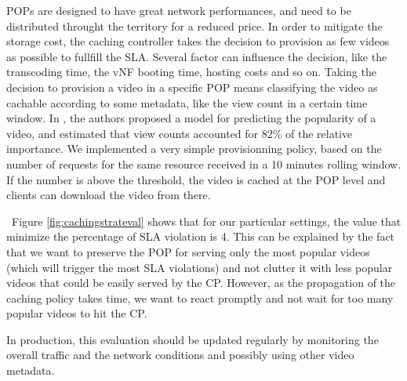POPs are designed to have great network performances, and need to be distributed throught the territory for a reduced price.
In order to mitigate the storage cost, the caching controller takes the decision to provision as few videos as possible to fullfill the SLA. Several factor can influence the decision, like the transcoding time, the vNF booting time, hosting costs and so on.
Taking the decision to provision a video in a specific POP means classifying the video as cachable according to some metadata, like the view count in a certain time window.
In \cite{silvestre_boosting_2015}, the authors proposed a model for predicting the popularity of a video, and estimated that view counts accounted for 82\% of the relative importance. 
We implemented a very simple provisionning policy, based on the number of requests for the same resource received in a 10 minutes rolling window. If the number is above the threshold, the video is cached at the POP level and clients can download the video from there.

~Figure \ref{fig:cachingstrateval} shows that for our particular settings, the value that minimize the percentage of SLA violation is 4. This can be explained by the fact that we want to preserve the POP for serving only the most popular videos (which will trigger the most SLA violations) and not clutter it with less popular videos that could be easily served by the CP. However, as the propagation of the caching policy takes time, we want to react promptly and not wait for too many popular videos to hit the CP.

In production, this evaluation should be updated regularly by monitoring the overall traffic and the network conditions and possibly using other video metadata.






